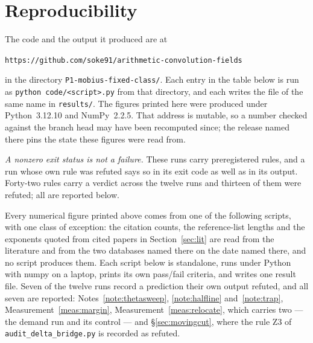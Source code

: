 \documentclass[11pt,a4paper]{article}
\theoremstyle{plain}
\theoremstyle{definition}
\theoremstyle{remark}
\begin{document}
\section{Reproducibility}\label{sec:repro}

The code and the output it produced are at

\begin{center}
\texttt{https://github.com/soke91/arithmetic-convolution-fields}
\end{center}

\noindent in the directory \texttt{P1-mobius-fixed-class/}. Each entry
in the table below is run as \texttt{python code/<script>.py} from that
directory, and each writes the file of the same name in
\texttt{results/}. The figures printed here were produced under
Python~3.12.10 and NumPy~2.2.5. That address is mutable, so a number
checked against the branch head may have been recomputed since; the
release named there pins the state these figures were read from.

\emph{A nonzero exit status is not a failure.} These runs carry
preregistered rules, and a run whose own rule was refuted says so in
its exit code as well as in its output. Forty-two rules carry a
verdict across the twelve runs and thirteen of them were refuted; all
are reported below.

Every numerical figure printed above comes from one of the following
scripts, with one class of exception: the citation counts, the
reference-list lengths and the exponents quoted from cited papers in
Section~\ref{sec:lit} are read from the literature and from the two
databases named there on the date named there, and no script produces
them. Each script below is standalone, runs under Python with numpy on
a laptop, prints its own pass/fail criteria, and writes one result
file. Seven of the twelve runs record a prediction their own output
refuted, and all seven are reported:
Notes~\ref{note:thetasweep}, \ref{note:halfline} and~\ref{note:trap},
Measurement~\ref{meas:margin}, Measurement~\ref{meas:relocate}, which
carries two --- the demand run and its control --- and
\S\ref{sec:movingcut}, where the rule Z3 of
\texttt{audit\_delta\_bridge.py} is recorded as refuted.
\end{document}

